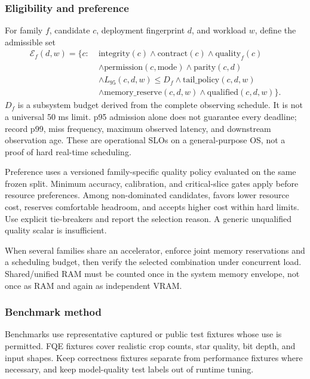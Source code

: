 \documentclass[11pt,a4paper]{article}
\newcommand{\code}[1]{\texttt{\detokenize{#1}}}
\begin{document}
\subsubsection{Eligibility and preference}
For family $f$, candidate $c$, deployment fingerprint $d$, and workload $w$,
define the admissible set
\begin{align*}
\mathcal E_f(d,w)=\{c:\;&\mathrm{integrity}(c)\land\mathrm{contract}(c)
 \land\mathrm{quality}_f(c)\\
 &\land\mathrm{permission}(c,\mathrm{mode})
 \land\mathrm{parity}(c,d)\\
 &\land L_{95}(c,d,w)\leq D_f
 \land\mathrm{tail\_policy}(c,d,w)\\
 &\land\mathrm{memory\_reserve}(c,d,w)
 \land\mathrm{qualified}(c,d,w)\}.
\end{align*}
$D_f$ is a subsystem budget derived from the complete observing schedule.
It is not a universal 50 ms limit. p95 admission alone does not guarantee every
deadline; record p99, miss frequency, maximum observed latency, and downstream
observation age. These are operational SLOs on a general-purpose OS, not a proof
of hard real-time scheduling.

Preference uses a versioned family-specific quality policy evaluated on the
same frozen split. Minimum accuracy, calibration, and critical-slice gates apply
before resource preferences. Among non-dominated candidates, \code{efficient}
favors lower resource cost, \code{balanced} reserves comfortable headroom, and
\code{quality} accepts higher cost within hard limits. Use explicit tie-breakers
and report the selection reason. A generic unqualified quality scalar is
insufficient.

When several families share an accelerator, enforce joint memory reservations
and a scheduling budget, then verify the selected combination under concurrent
load. Shared/unified RAM must be counted once in the system memory envelope,
not once as RAM and again as independent VRAM.

\subsubsection{Benchmark method}
Benchmarks use representative captured or public test fixtures whose use is
permitted. FQE fixtures cover realistic crop counts, star quality, bit depth,
and input shapes. Keep correctness fixtures separate from performance fixtures
where necessary, and keep model-quality test labels out of runtime tuning.
\end{document}
